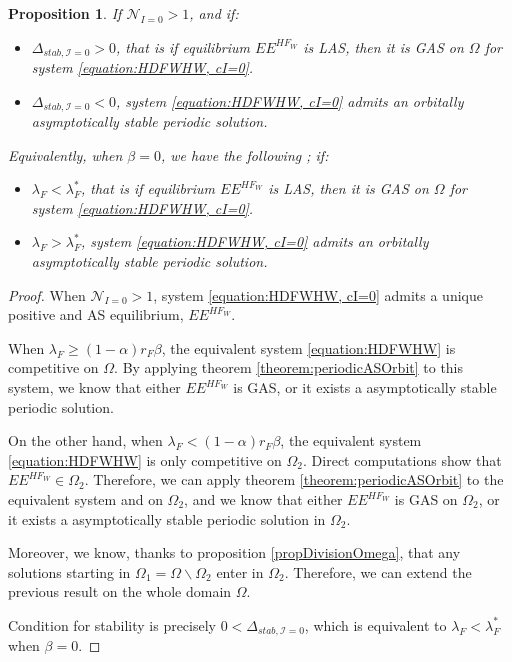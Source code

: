 \documentclass{article}
\newcommand{\lfw}{\lambda_{F}}
\newcommand{\lfw}{\lambda_{F}}
\newcommand{\cI}{\mathcal{I}}
\newtheorem{prop}{Proposition}
\begin{document}
\begin{prop}\label{LimitCycle, cI=0}
If $\mathcal{N}_{I =0} > 1$, and if:
\begin{itemize}
\item $\Delta_{stab, \cI =0} > 0$, that is if equilibrium $EE^{HF_W}$ is LAS, then it is GAS on $\Omega$ for system \eqref{equation:HDFWHW, cI=0}.
\item $\Delta_{stab, \cI =0} < 0$, system \eqref{equation:HDFWHW, cI=0} admits an orbitally asymptotically stable periodic solution.
\end{itemize}

Equivalently, when $\beta = 0$, we have the following ; if:
\begin{itemize}
\item $\lfw <  \lfw^*$, that is if equilibrium $EE^{HF_W}$ is LAS, then it is GAS on $\Omega$ for system \eqref{equation:HDFWHW, cI=0}.
\item $\lfw  > \lfw^*$, system \eqref{equation:HDFWHW, cI=0} admits an orbitally asymptotically stable periodic solution.
\end{itemize}
\end{prop}

\begin{proof}
When $\mathcal{N}_{I =0} > 1$, system \eqref{equation:HDFWHW, cI=0} admits a unique positive and AS equilibrium, $EE^{HF_W}$.  

When $\lfw \geq (1-\alpha)r_F \beta$, the equivalent system \eqref{equation:HDFWHW} is competitive on $\Omega$. By applying theorem \ref{theorem:periodicASOrbit} to this system, we know that either $EE^{HF_W}$ is GAS, or it exists a asymptotically stable periodic solution. 
\medskip

On the other hand, when $\lfw < (1-\alpha)r_F \beta$, the equivalent system \eqref{equation:HDFWHW} is only competitive on $\Omega_2$. Direct computations show that $EE^{HF_W} \in \Omega_2$. Therefore, we can apply theorem \ref{theorem:periodicASOrbit} to the equivalent system and on $\Omega_2$, and we know that either $EE^{HF_W}$ is GAS on $\Omega_2$, or it exists a asymptotically stable periodic solution in $\Omega_2$. 

Moreover, we know, thanks to proposition \eqref{propDivisionOmega}, that any solutions starting in $\Omega_1 = \Omega \backslash \Omega_2$ enter in $\Omega_2$. Therefore, we can extend the previous result on the whole domain $\Omega$.

Condition for stability is precisely $0 < \Delta_{stab, \cI =0}$, which is equivalent to $\lfw < \lfw^*$ when $\beta = 0$.
\end{proof} 
\end{document}
